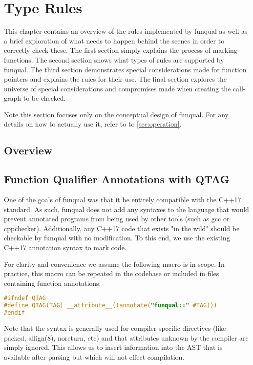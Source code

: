 \chapter{Type Rules}\label{sec:rules}

This chapter contains an overview of the rules implemented by funqual as well as a brief exploration of what needs to happen behind the scenes in order to correctly check these.  The first section simply explains the process of marking functions.  The second section shows what types of rules are supported by funqual.  The third section demonstrates special considerations made for function pointers and explains the rules for their use.  The final section explores the universe of special considerations and compromises made when creating the call-graph to be checked.  

Note this section focuses only on the conceptual design of funqual.  For any details on how to actually use it, refer to to \ref{sec:operation}.

\section{Overview}

\section{Function Qualifier Annotations with QTAG}

One of the goals of funqual was that it be entirely compatible with the C++17 standard.  As such, funqual does not add any syntaxes to the language that would prevent annotated programs from being used by other tools (such as gcc or cppchecker).  Additionally, any C++17 code that exists "in the wild" should be checkable by funqual with no modification.  To this end, we use the existing C++17 annotation syntax to mark code.  

For clarity and convenience we assume the following macro is in scope.  In practice, this macro can be repeated in the codebase or included in files containing function annotations:

\begin{lstlisting}[language=C]
#ifndef QTAG
#define QTAG(TAG) __attribute__((annotate("funqual::" #TAG)))
#endif
\end{lstlisting}


Note that the  syntax is generally used for compiler-specific directives (like packed, allign(8), noreturn, etc) and that attributes unknown by the compiler are simply ignored.  This allows us to insert information into the AST that is available after parsing but which will not effect compilation.

